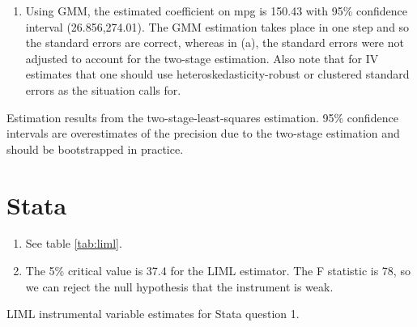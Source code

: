 \documentclass{article}
\begin{document}
\begin{enumerate}
\begin{enumerate}[label=(\alph*)]
\end{enumerate}
\item Using GMM, the estimated coefficient on mpg is 150.43 with 95\% confidence interval (26.856,274.01).  The GMM estimation takes place in one step and so the standard errors are correct, whereas in (a), the standard errors were not adjusted to account for the two-stage estimation.  Also note that for IV estimates that one should use heteroskedasticity-robust or clustered standard errors as the situation calls for.
\end{enumerate}

\begin{table}[ht!]
    \centering
    
    \caption{Estimation results from the two-stage-least-squares estimation.  95\% confidence intervals are overestimates of the precision due to the two-stage estimation and should be bootstrapped in practice.}
    \label{tab:hw6ivoutput}
\end{table}

\section{Stata}

\begin{enumerate}
    \item See table \ref{tab:liml}.
    \item The 5\% critical value is 37.4 for the LIML estimator.  The F statistic is 78, so we can reject the null hypothesis that the instrument is weak.
\end{enumerate}

\begin{table}[hb]
    \centering
    
    \caption{LIML instrumental variable estimates for Stata question 1.}
    \label{tab:liml}
\end{table}
\end{document}
